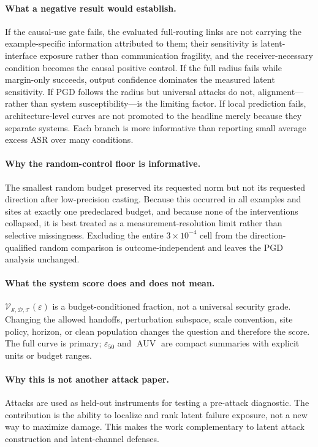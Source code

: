 \documentclass[11pt]{article}
\DeclareMathOperator{\AUV}{AUV}
\newcommand{\eps}{\varepsilon}
\newcommand{\Vuln}{\mathcal V}
\newcommand{\sys}{\mathcal S}
\newcommand{\threat}{\mathcal T}
\begin{document}
\paragraph{What a negative result would establish.}
If the causal-use gate fails, the evaluated full-routing links are not carrying
the example-specific information attributed to them; their sensitivity is
latent-interface exposure rather than communication fragility, and the
receiver-necessary condition becomes the causal positive control. If the full
radius fails while margin-only succeeds, output confidence dominates the
measured latent sensitivity. If PGD follows the radius but universal attacks do
not, alignment---rather than system susceptibility---is the limiting factor.
If local prediction fails, architecture-level curves are not promoted to the
headline merely because they separate systems. Each branch is more informative
than reporting small average excess ASR over many conditions.

\paragraph{Why the random-control floor is informative.}
The smallest random budget preserved its requested norm but not its requested
direction after low-precision casting. Because this occurred in all examples
and sites at exactly one predeclared budget, and because none of the
interventions collapsed, it is best treated as a measurement-resolution limit
rather than selective missingness. Excluding the entire $3\times10^{-4}$ cell
from the direction-qualified random comparison is outcome-independent and
leaves the PGD analysis unchanged.

\paragraph{What the system score does and does not mean.}
\(\Vuln_{\sys,\mathcal D,\threat}(\eps)\) is a budget-conditioned fraction,
not a universal security grade. Changing the allowed handoffs, perturbation
subspace, scale convention, site policy, horizon, or clean population changes
the question and therefore the score. The full curve is primary;
\(\eps_{50}\) and \(\AUV\) are compact summaries with explicit units or
budget ranges.

\paragraph{Why this is not another attack paper.}
Attacks are used as held-out instruments for testing a pre-attack diagnostic.
The contribution is the ability to localize and rank latent failure exposure,
not a new way to maximize damage. This makes the work complementary to latent
attack construction and latent-channel defenses.
\end{document}
